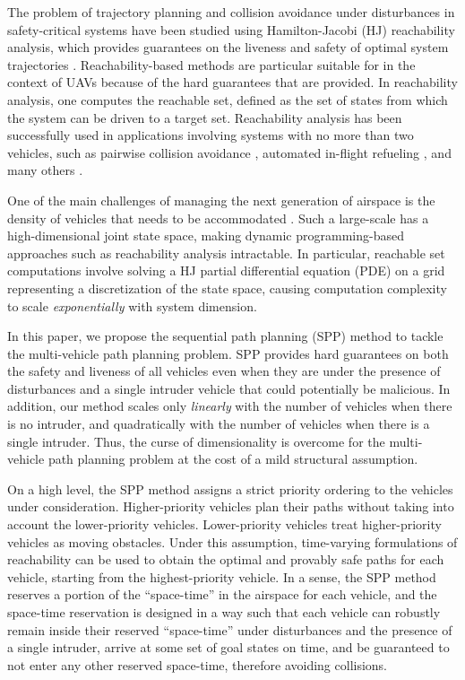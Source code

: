 The problem of trajectory planning and collision avoidance under disturbances in safety-critical systems have been studied using Hamilton-Jacobi (HJ) reachability analysis, which provides guarantees on the liveness and safety of optimal system trajectories \cite{Barron90, Mitchell05, Bokanowski10, Bokanowski11, Margellos11, Fisac15}. Reachability-based methods are particular suitable for in the context of UAVs because of the hard guarantees that are provided. In reachability analysis, one computes the reachable set, defined as the set of states from which the system can be driven to a target set. Reachability analysis has been successfully used in applications involving systems with no more than two vehicles, such as pairwise collision avoidance \cite{Mitchell05}, automated in-flight refueling \cite{Ding08}, and many others \cite{Huang11, Bayen07}.

One of the main challenges of managing the next generation of airspace is the density of vehicles that needs to be accommodated \cite{Kopardekar16}. Such a large-scale has a high-dimensional joint state space, making dynamic programming-based approaches such as reachability analysis intractable. In particular, reachable set computations involve solving a HJ partial differential equation (PDE) on a grid representing a discretization of the state space, causing computation complexity to scale \textit{exponentially} with system dimension.

In this paper, we propose the sequential path planning (SPP) method to tackle the multi-vehicle path planning problem. SPP provides hard guarantees on both the safety and liveness of all vehicles even when they are under the presence of disturbances and a single intruder vehicle that could potentially be malicious. In addition, our method scales only \textit{linearly} with the number of vehicles when there is no intruder, and quadratically with the number of vehicles when there is a single intruder. Thus, the curse of dimensionality is overcome for the multi-vehicle path planning problem at the cost of a mild structural assumption. 

On a high level, the SPP method assigns a strict priority ordering to the vehicles under consideration. Higher-priority vehicles plan their paths without taking into account the lower-priority vehicles. Lower-priority vehicles treat higher-priority vehicles as moving obstacles. Under this assumption, time-varying formulations of reachability \cite{Bokanowski11, Fisac15} can be used to obtain the optimal and provably safe paths for each vehicle, starting from the highest-priority vehicle. In a sense, the SPP method reserves a portion of the ``space-time'' in the airspace for each vehicle, and the space-time reservation is designed in a way such that each vehicle can robustly remain inside their reserved ``space-time'' under disturbances and the presence of a single intruder, arrive at some set of goal states on time, and be guaranteed to not enter any other reserved space-time, therefore avoiding collisions.

